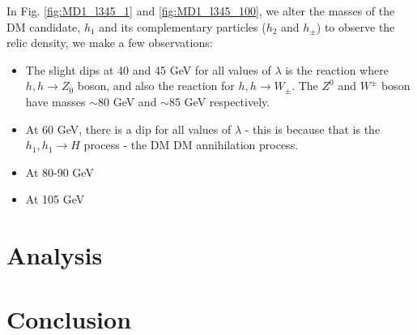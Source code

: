 \documentclass[12pt]{article}
\begin{document}
In Fig. \ref{fig:MD1_l345_1} and \ref{fig:MD1_l345_100}, we alter the masses of the DM candidate, $h_1$ and its complementary particles ($h_2$ and $h_{\pm}$) to observe the relic density, we make a few observations:
\begin{itemize}
    \item The slight dips at 40 and 45 GeV for all values of $\lambda$ is the reaction where $h, h \rightarrow Z_0$ boson, and also the reaction for $h, h \rightarrow W_\pm$. The $Z^0$ and $W^\pm$ boson have masses $\sim$80 GeV and $\sim$85 GeV respectively.
    \item At 60 GeV, there is a dip for all values of $\lambda$ - this is because that is the $h_1,h_1\rightarrow H$ process - the DM DM annihilation process. 
    \item At 80-90 GeV
    \item At 105 GeV
\end{itemize}

\section{Analysis}
\label{sec:analysis}

\section{Conclusion}
\label{sec:conclusion}

\newpage


\end{document}
